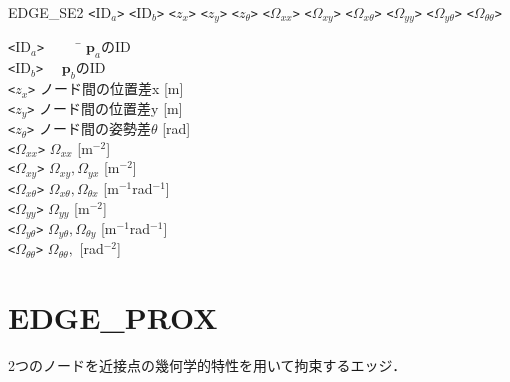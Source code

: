 \documentclass[dvipdfmx]{jsarticle}
\begin{document}
EDGE\_SE2 \verb|<|ID$_a$\verb|>| \verb|<|ID$_b$\verb|>| \verb|<|$z_x$\verb|>| \verb|<|$z_y$\verb|>| \verb|<|$z_\theta$\verb|>| \verb|<|$\Omega_{xx}$\verb|>| \verb|<|$\Omega_{xy}$\verb|>| \verb|<|$\Omega_{x\theta}$\verb|>| \verb|<|$\Omega_{yy}$\verb|>| \verb|<|$\Omega_{y\theta}$\verb|>| \verb|<|$\Omega_{\theta\theta}$\verb|>|

\begin{tabbing}
	\verb|<|ID$_a$\verb|>|　	　					\= $\bm{p}_a$のID \\
	\verb|<|ID$_b$\verb|>|　 						\> $\bm{p}_b$のID \\
	\verb|<|$z_x$\verb|>| 						\> ノード間の位置差x [m] \\
	\verb|<|$z_y$\verb|>| 						\> ノード間の位置差y [m] \\
	\verb|<|$z_\theta$\verb|>| 					\> ノード間の姿勢差$\theta$ [rad] \\
	\verb|<|$\Omega_{xx}$\verb|>|				\> $\Omega_{xx}$ [m$^{-2}$] \\
	\verb|<|$\Omega_{xy}$\verb|>|				\> $\Omega_{xy}, \Omega_{yx}$ [m$^{-2}$] \\
	\verb|<|$\Omega_{x\theta}$\verb|>|			\> $\Omega_{x\theta}, \Omega_{\theta x}$ [m$^{-1}$rad$^{-1}$] \\
	\verb|<|$\Omega_{yy}$\verb|>|				\> $\Omega_{yy}$ [m$^{-2}$] \\
	\verb|<|$\Omega_{y\theta}$\verb|>|			\> $\Omega_{y\theta}, \Omega_{\theta y}$ [m$^{-1}$rad$^{-1}$] \\
	\verb|<|$\Omega_{\theta\theta}$\verb|>|		\> $\Omega_{\theta\theta},$ [rad$^{-2}$]
\end{tabbing}

\clearpage

\section{EDGE\_PROX}
2つのノードを近接点の幾何学的特性を用いて拘束するエッジ．
\end{document}
